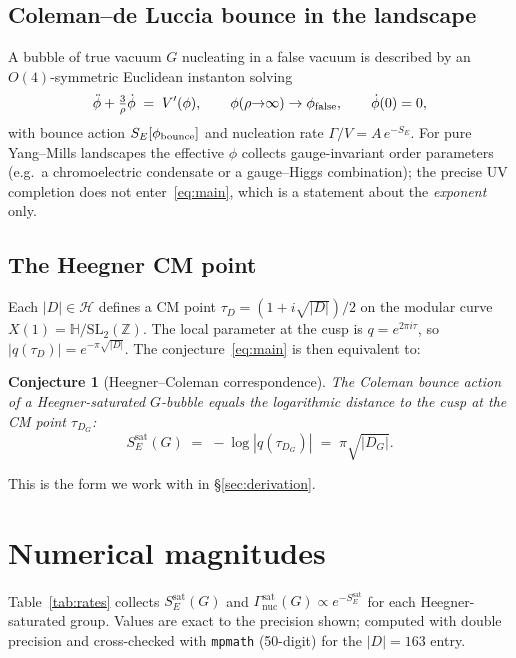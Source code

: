 \documentclass[11pt,a4paper]{article}
\theoremstyle{plain}
\newtheorem{conjecture}{Conjecture}
\theoremstyle{definition}
\newcommand{\Z}{\mathbb{Z}}
\newcommand{\Hb}{\mathbb{H}}
\newcommand{\sat}{\mathrm{sat}}
\newcommand{\nuc}{\mathrm{nuc}}
\begin{document}
\subsection{Coleman--de Luccia bounce in the landscape}

A bubble of true vacuum $G$ nucleating in a false vacuum is described by an $O(4)$-symmetric Euclidean instanton solving
\begin{equation}\label{eq:CDL}
\ddot\phi + \tfrac{3}{\rho}\dot\phi \;=\; V'(\phi),\qquad
\phi(\rho{\to}\infty)\to\phi_{\rm false},\qquad \dot\phi(0)=0,
\end{equation}
with bounce action $S_E[\phi_{\rm bounce}]$ and nucleation rate $\Gamma/V=A\,e^{-S_E}$. For pure Yang--Mills landscapes the effective $\phi$ collects gauge-invariant order parameters (e.g.\ a chromoelectric condensate or a gauge--Higgs combination); the precise UV completion does not enter~\eqref{eq:main}, which is a statement about the \emph{exponent} only.

\subsection{The Heegner CM point}

Each $|D|\in\mathcal{H}$ defines a CM point $\tau_D=(1+i\sqrt{|D|})/2$ on the modular curve $X(1)=\Hb/\mathrm{SL}_2(\Z)$. The local parameter at the cusp is $q=e^{2\pi i\tau}$, so $|q(\tau_D)|=e^{-\pi\sqrt{|D|}}$. The conjecture~\eqref{eq:main} is then equivalent to:

\begin{conjecture}[Heegner--Coleman correspondence]\label{conj:main}
The Coleman bounce action of a Heegner-saturated $G$-bubble equals the logarithmic distance to the cusp at the CM point $\tau_{D_G}$:
\[
S_E^{\sat}(G) \;=\; -\log|q(\tau_{D_G})| \;=\; \pi\sqrt{|D_G|}.
\]
\end{conjecture}

This is the form we work with in \S\ref{sec:derivation}.

\section{Numerical magnitudes}\label{sec:numbers}

Table~\ref{tab:rates} collects $S_E^{\sat}(G)$ and $\Gamma_{\nuc}^{\sat}(G)\propto e^{-S_E^{\sat}}$ for each Heegner-saturated group. Values are exact to the precision shown; computed with double precision and cross-checked with \texttt{mpmath} (50-digit) for the $|D|=163$ entry.
\end{document}
